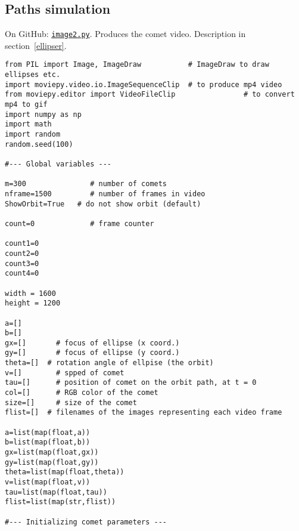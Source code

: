 \documentclass[oneside,10pt]{book}
\begin{document}
\subsection{Paths simulation}
 
On GitHub: \href{https://github.com/VincentGranville/Visualizations/blob/main/Source-Code/image2.py}{\texttt{image2.py}}. Produces the comet video. Description in section~\ref{ellipser}.  

\begin{lstlisting}
from PIL import Image, ImageDraw           # ImageDraw to draw ellipses etc.
import moviepy.video.io.ImageSequenceClip  # to produce mp4 video
from moviepy.editor import VideoFileClip                # to convert mp4 to gif
import numpy as np
import math
import random
random.seed(100)

#--- Global variables ---

m=300               # number of comets
nframe=1500         # number of frames in video
ShowOrbit=True   # do not show orbit (default)

count=0             # frame counter 

count1=0
count2=0
count3=0
count4=0

width = 1600
height = 1200

a=[]    
b=[]
gx=[]       # focus of ellipse (x coord.)
gy=[]       # focus of ellipse (y coord.)
theta=[]  # rotation angle of ellpise (the orbit)
v=[]        # spped of comet
tau=[]      # position of comet on the orbit path, at t = 0
col=[]      # RGB color of the comet
size=[]     # size of the comet
flist=[]  # filenames of the images representing each video frame

a=list(map(float,a))
b=list(map(float,b))
gx=list(map(float,gx))
gy=list(map(float,gy))
theta=list(map(float,theta))
v=list(map(float,v))
tau=list(map(float,tau))
flist=list(map(str,flist))

#--- Initializing comet parameters ---


\end{lstlisting}
\end{document}
